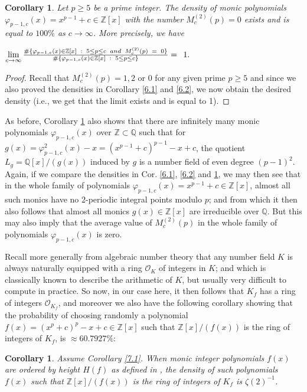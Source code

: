 \documentclass{article}
\theoremstyle{plain}
\newtheorem{cor}[thm]{Corollary}
\theoremstyle{definition}
\begin{document}
\begin{cor} \label{7.2}
Let $p\geq 5$ be a prime integer. The density of monic polynomials $\varphi_{p-1, c}(x) = x^{p-1}+c\in \mathbb{Z}[x]$ with the number $M_{c}^{(2)}(p) = 0$ exists and is equal to $100 \%$ as $c\to \infty$. More precisely, we have 
\begin{center}
    $\lim\limits_{c\to\infty} \Large{\frac{\# \{\varphi_{p-1, c}(x)\in \mathbb{Z}[x] \ : \ 5\leq p\leq c \ and \ M_{c}^{(2)}(p) \ = \ 0 \}}{\Large{\# \{\varphi_{p-1,c}(x) \in \mathbb{Z}[x] \ : \ 5\leq p\leq c \}}}} = \ 1.$
\end{center}
\end{cor}
\begin{proof}
Recall that $M_{c}^{(2)}(p) = 1, 2$ or $0$ for any given prime $p\geq 5$ and since we also proved the densities in Corollary \ref{6.1} and \ref{6.2}, we now obtain the desired density (i.e., we get that the limit exists and is equal to 1).
\end{proof}
\noindent As before, Corollary \ref{7.2} also shows that there are infinitely many monic polynomials $\varphi_{p-1,c}(x)$ over $\mathbb{Z}\subset \mathbb{Q}$ such that for $g(x) = \varphi_{p-1,c}^2(x)-x = (x^{p-1}+c)^{p-1}-x+c$, the quotient $L_{g} = \mathbb{Q}[x]\slash (g(x))$ induced by $g$ is a number field of even degree $(p-1)^2$. Again, if we compare the densities in Cor. \ref{6.1}, \ref{6.2} and \ref{7.2}, we may then see that in the whole family of polynomials $\varphi_{p-1,c}(x) = x^{p-1} +c\in \mathbb{Z}[x]$, almost all such monics have no $2$-periodic integral points modulo $p$; and from which it then also follows that almost all monics $g(x)\in \mathbb{Z}[x]$ are irreducible over $\mathbb{Q}$. But this may also imply that the average value of $M_{c}^{(2)}(p)$ in the whole family of polynomials $\varphi_{p-1,c}(x)$ is zero.


Recall more generally from algebraic number theory that any number field $K$ is always naturally equipped with a ring $\mathcal{O}_{K}$ of integers in $K$; and which is classically known to describe the arithmetic of $K$, but usually very difficult to compute in practice. So now, in our case here, it then follows that $K_{f}$ has a ring of integers $\mathcal{O}_{K_{f}}$, and moreover we also have the following corollary showing that the probability of choosing randomly a polynomial $f(x)=(x^p+c)^p-x+c\in \mathbb{Z}[x]$ such that $\mathbb{Z}[x]\slash (f(x))$ is the ring of integers of $K_{f}$, is $\approx 60.7927\%$:
\begin{cor} \label{7.3}
Assume Corollary \ref{7.1}. When monic integer polynomials $f(x)$ are ordered by height $H(f)$ as defined in \textnormal{\cite{sch1}}, the density of such polynomials $f(x)$ such that $\mathbb{Z}[x]\slash (f(x))$ is the ring of integers of $K_{f}$ is $\zeta(2)^{-1}$. 
\end{cor}
\end{document}
